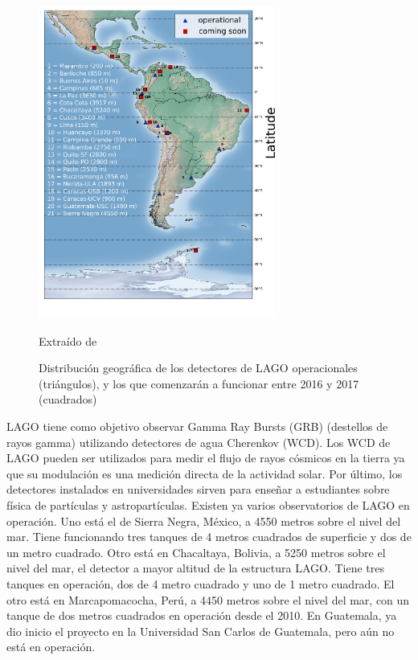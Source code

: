\documentclass{book}
\begin{document}
\begin{figure}[ht] %
\begin{center}
 \includegraphics[width = 0.5\linewidth]{ASOREY2015.png}
 
 Extra\'ido de \citep{ASOREY2015}
\caption{Distribuci\'on geogr\'afica de los detectores de LAGO operacionales (tri\'angulos), y los que comenzar\'an a funcionar entre 2016 y 2017 (cuadrados)}
\end{center}
\end{figure}

LAGO tiene como objetivo observar Gamma Ray Bursts (GRB) (destellos de rayos gamma) utilizando detectores de agua Cherenkov (WCD). Los WCD de LAGO pueden ser utilizados para medir el flujo de rayos c\'osmicos en la tierra ya que su modulaci\'on es una medici\'on directa de la actividad solar. Por \'ultimo, los detectores instalados en universidades sirven para ense\~nar a estudiantes sobre f\'isica de part\'iculas y astropart\'iculas. Existen ya varios observatorios de LAGO en operaci\'on. Uno est\'a el de Sierra Negra, M\'exico, a 4550 metros sobre el nivel del mar. Tiene funcionando tres tanques de 4 metros cuadrados de superficie y dos de un metro cuadrado. Otro est\'a en Chacaltaya, Bolivia, a 5250 metros sobre el nivel del mar, el detector a mayor altitud de la estructura LAGO. Tiene tres tanques en operaci\'on, dos de 4 metro cuadrado y uno de 1 metro cuadrado. El otro est\'a en Marcapomacocha, Per\'u, a 4450 metros sobre el nivel del mar, con un tanque de dos metros cuadrados en operaci\'on desde el 2010. En Guatemala, ya dio inicio el proyecto en la Universidad San Carlos de Guatemala, pero a\'un no est\'a en operaci\'on. \citep{VILLASENOR}
\end{document}
